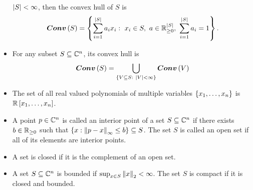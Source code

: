 \begin{itemize}
  $\left|S\right|<\infty$, then the convex hull of $S$ is
%
  \[
\bm{Conv}\left(S\right)=\left\{\sum_{i=1}^{\left|S\right|}a_ix_i:~x_i\in
  S,~a\in\mathbb{R}^{\left|S\right|}_{\geq 0},~\sum_{i=1}^{\left|S\right|}a_i=1\right\}.
  \]
\item For any subset $S\subseteq\mathbb{C}^n$, its convex hull is
%
  \[
\bm{Conv}\left(S\right)=\bigcup_{\left\{V\subseteq S:~\left|V\right|<\infty\right\}}\bm{Conv}\left(V\right)
  \]
\item The set of all real valued polynomials of multiple variables
  $\left\{x_1,\ldots,x_n\right\}$ is $\mathbb{R}\left[x_1,\ldots,x_n\right]$.
\item A point $p\in\mathbb{C}^n$ is called an interior point of a set
  $S\subseteq\mathbb{C}^n$ if there exists $b\in\mathbb{R}_{\geq 0}$ such
  that $\left\{x:\left\|p-x\right\|_{\infty}\leq b\right\}\subseteq S$.  The set $S$ is called
  an open set if all of its elements are interior points.
\item A set is closed if it is the complement of an open set.
\item A set $S\subseteq\mathbb{C}^n$ is bounded if $\sup_{x\in
  S}\left\|x\right\|_2< \infty$.  The set $S$ is compact if it is closed and
  bounded.
\end{itemize}


